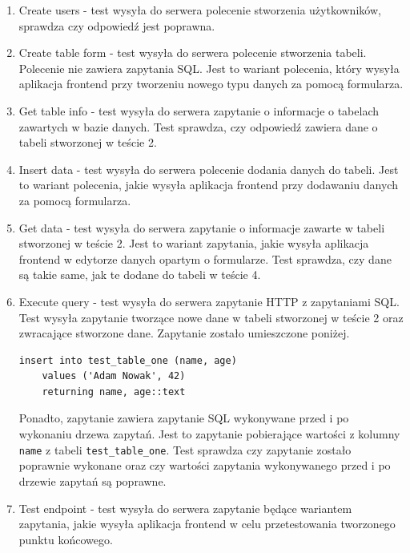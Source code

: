 \begin{enumerate}

    \item Create users - test wysyła do serwera polecenie stworzenia
        użytkowników, sprawdza czy odpowiedź jest poprawna.

    \item Create table form - test wysyła do serwera polecenie stworzenia
        tabeli. Polecenie nie zawiera zapytania SQL. Jest to wariant polecenia,
        który wysyła aplikacja frontend przy tworzeniu nowego typu danych za
        pomocą formularza.

    \item Get table info - test wysyła do serwera zapytanie o informacje o
        tabelach zawartych w bazie danych. Test sprawdza, czy odpowiedź zawiera
        dane o tabeli stworzonej w teście 2.

    \item Insert data - test wysyła do serwera polecenie dodania danych do
        tabeli. Jest to wariant polecenia, jakie wysyła aplikacja frontend przy
        dodawaniu danych za pomocą formularza.

    \item Get data - test wysyła do serwera zapytanie o informacje zawarte w
        tabeli stworzonej w teście 2. Jest to wariant zapytania, jakie wysyła
        aplikacja frontend w edytorze danych opartym o formularze. Test
        sprawdza, czy dane są takie same, jak te dodane do tabeli w teście 4.

    \item Execute query - test wysyła do serwera zapytanie HTTP z zapytaniami
        SQL. Test wysyła zapytanie tworzące nowe dane w tabeli stworzonej w
        teście 2 oraz zwracające stworzone dane. Zapytanie zostało umieszczone
        poniżej.

        \begin{verbatim}
insert into test_table_one (name, age)
    values ('Adam Nowak', 42)
    returning name, age::text
        \end{verbatim}

        Ponadto, zapytanie zawiera zapytanie SQL wykonywane przed i po wykonaniu
        drzewa zapytań. Jest to zapytanie pobierające wartości z kolumny
        \verb|name| z tabeli \verb|test_table_one|. Test sprawdza czy zapytanie
        zostało poprawnie wykonane oraz czy wartości zapytania wykonywanego
        przed i po drzewie zapytań są poprawne.

    \item Test endpoint - test wysyła do serwera zapytanie będące wariantem
        zapytania, jakie wysyła aplikacja frontend w celu przetestowania
        tworzonego punktu końcowego.

\end{enumerate}

